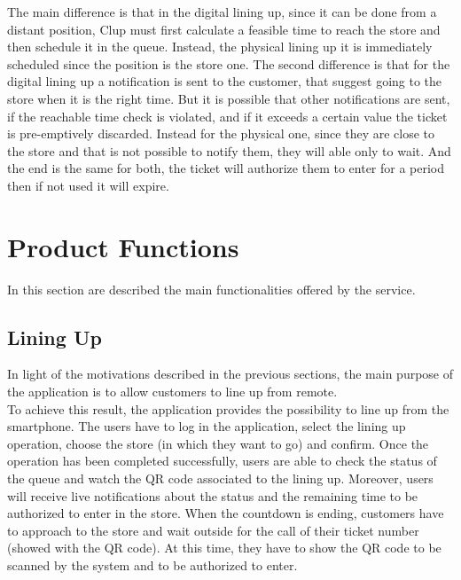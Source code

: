 The main difference is that in the digital lining up, since it can be done from a distant position, Clup must first calculate a feasible time to reach the store and then schedule it in the queue. Instead, the physical lining up it is immediately scheduled since the position is the store one. The second difference is that for the digital lining up a notification is sent to the customer, that suggest going to the store when it is the right time. But it is possible that other notifications are sent, if the reachable time check is violated, and if it exceeds a certain value the ticket is pre-emptively discarded. Instead for the physical one, since they are close to the store and that is not possible to notify them, they will able only to wait.
And the end is the same for both, the ticket will authorize them to enter for a period then if not used it will expire.


\section{Product Functions}

In this section are described the main functionalities offered by the service.

\subsection{Lining Up}
In light of the motivations described in the previous sections, the main purpose of the application is to allow customers to line up from remote.\\
To achieve this result, the application provides the possibility to line up from the smartphone.
The users have to log in the application, select the lining up operation, choose the store (in which they want to go) and confirm.
Once the operation has been completed successfully, users are able to check the status of the queue and watch the QR code associated to the lining up.
Moreover, users will receive live notifications about the status and the remaining time to be authorized to enter in the store.
When the countdown is ending, customers have to approach to the store and wait outside for the call of their ticket number (showed with the QR code). At this time, they have to show the QR code to be scanned by the system and to be authorized to enter.

